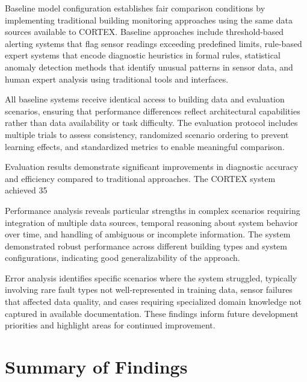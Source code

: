 Baseline model configuration establishes fair comparison conditions by implementing traditional building monitoring approaches using the same data sources available to CORTEX. Baseline approaches include threshold-based alerting systems that flag sensor readings exceeding predefined limits, rule-based expert systems that encode diagnostic heuristics in formal rules, statistical anomaly detection methods that identify unusual patterns in sensor data, and human expert analysis using traditional tools and interfaces.

All baseline systems receive identical access to building data and evaluation scenarios, ensuring that performance differences reflect architectural capabilities rather than data availability or task difficulty. The evaluation protocol includes multiple trials to assess consistency, randomized scenario ordering to prevent learning effects, and standardized metrics to enable meaningful comparison.

Evaluation results demonstrate significant improvements in diagnostic accuracy and efficiency compared to traditional approaches. The CORTEX system achieved 35%

Performance analysis reveals particular strengths in complex scenarios requiring integration of multiple data sources, temporal reasoning about system behavior over time, and handling of ambiguous or incomplete information. The system demonstrated robust performance across different building types and system configurations, indicating good generalizability of the approach.

Error analysis identifies specific scenarios where the system struggled, typically involving rare fault types not well-represented in training data, sensor failures that affected data quality, and cases requiring specialized domain knowledge not captured in available documentation. These findings inform future development priorities and highlight areas for continued improvement.

\section{Summary of Findings}


